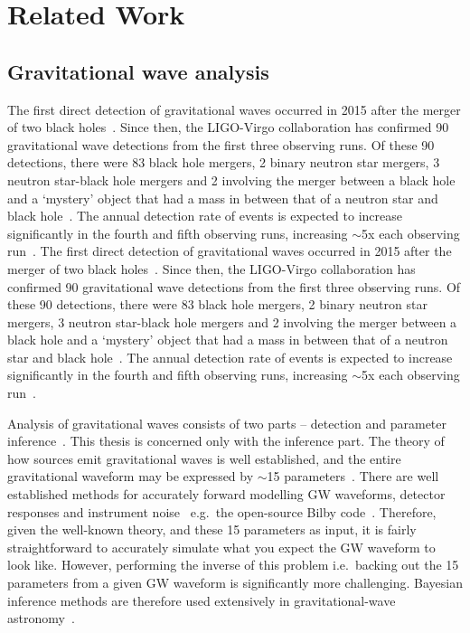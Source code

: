 \section{Related Work}\label{sec:related_work}

\subsection{Gravitational wave analysis}

The first direct detection of gravitational waves occurred in 2015 after the merger of two black holes~\cite{LIGO_2016}. Since then, the LIGO-Virgo collaboration has confirmed 90 gravitational wave detections from the first three observing runs. Of these 90 detections, there were 83 black hole mergers, 2 binary neutron star mergers, 3 neutron star-black hole mergers and 2 involving the merger between a black hole and a `mystery' object that had a mass in between that of a neutron star and black hole~\cite{LIGO_FAQ_Website}. The annual detection rate of events is expected to increase significantly in the fourth and fifth observing runs, increasing $\sim$5x each observing run~\cite{Petrov_2022}.
The first direct detection of gravitational waves occurred in 2015 after the merger of two black holes~\cite{LIGO_2016}. Since then, the LIGO-Virgo collaboration has confirmed 90 gravitational wave detections from the first three observing runs. Of these 90 detections, there were 83 black hole mergers, 2 binary neutron star mergers, 3 neutron star-black hole mergers and 2 involving the merger between a black hole and a `mystery' object that had a mass in between that of a neutron star and black hole~\cite{LIGO_FAQ_Website}. The annual detection rate of events is expected to increase significantly in the fourth and fifth observing runs, increasing $\sim$5x each observing run~\cite{Petrov_2022}.

Analysis of gravitational waves consists of two parts -- detection and parameter inference~\cite{bhardwaj2023peregrine}. This thesis is concerned only with the inference part. The theory of how sources emit gravitational waves is well established, and the entire gravitational waveform may be expressed by $\sim$15 parameters~\cite{Thrane_Talbot_2019}. There are well established methods for accurately forward modelling GW waveforms, detector responses and instrument noise~\cite{alvey2023things} e.g.~the open-source Bilby code~\cite{Ashton_Bilby_2019,Romero_Bilby_2020,Ashton_Talbot_Bilby_2021}. Therefore, given the well-known theory, and these 15 parameters as input, it is fairly straightforward to accurately simulate what you expect the GW waveform to look like. However, performing the inverse of this problem i.e.~backing out the 15 parameters from a given GW waveform is significantly more challenging. Bayesian inference methods are therefore used extensively in gravitational-wave astronomy~\cite{Thrane_Talbot_2019}.

